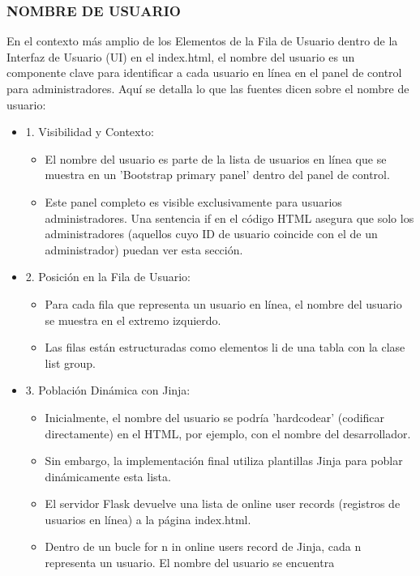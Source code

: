\documentclass{report}
\begin{document}
\subsubsection{NOMBRE DE USUARIO}
En el contexto más amplio de los Elementos de la Fila de Usuario dentro de la Interfaz de Usuario (UI) en el index.html, el nombre del 
usuario es un componente clave para identificar a cada usuario en línea en el panel de control para administradores.
Aquí se detalla lo que las fuentes dicen sobre el nombre de usuario:
\begin{itemize}
    \item 1. Visibilidad y Contexto:
        \begin{itemize}
            \item El nombre del usuario es parte de la lista de usuarios en línea que se muestra en un 'Bootstrap primary panel' dentro 
            del panel de control.
            \item Este panel completo es visible exclusivamente para usuarios administradores. Una sentencia if en el código HTML asegura 
            que solo los administradores (aquellos cuyo ID de usuario coincide con el de un administrador) puedan ver esta sección.
        \end{itemize}
    \item 2. Posición en la Fila de Usuario:
        \begin{itemize}
            \item Para cada fila que representa un usuario en línea, el nombre del usuario se muestra en el extremo izquierdo.
            \item Las filas están estructuradas como elementos li de una tabla con la clase list group.        
        \end{itemize}
    \item 3. Población Dinámica con Jinja:
        \begin{itemize}
            \item Inicialmente, el nombre del usuario se podría 'hardcodear' (codificar directamente) en el HTML, por ejemplo, con el nombre 
            del desarrollador.
            \item Sin embargo, la implementación final utiliza plantillas Jinja para poblar dinámicamente esta lista.
            \item El servidor Flask devuelve una lista de online user records (registros de usuarios en línea) a la página index.html.
            \item Dentro de un bucle for n in online users record de Jinja, cada n representa un usuario. El nombre del usuario se encuentra 

\end{itemize}
\end{itemize}
\end{document}
